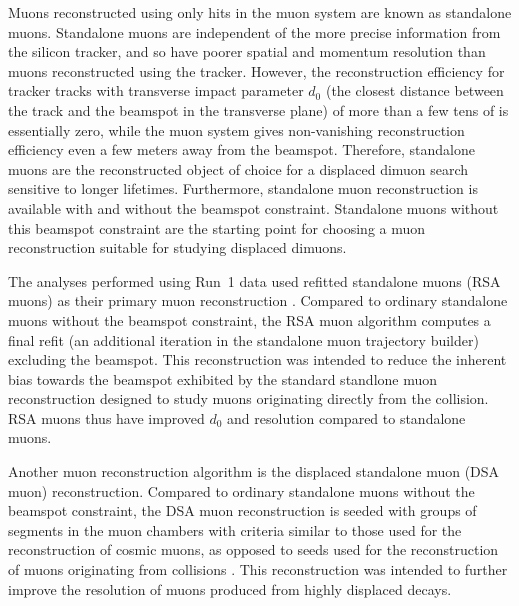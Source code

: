 Muons reconstructed using only hits in the muon system are known as standalone muons.
Standalone muons are independent of the more precise information from the silicon tracker, and so have poorer spatial and momentum resolution than muons reconstructed using the tracker.
However, the reconstruction efficiency for tracker tracks with transverse impact parameter $d_0$ (the closest distance between the track and the beamspot in the transverse plane) of more than a few tens of \cm is essentially zero, while the muon system gives non-vanishing reconstruction efficiency even a few meters away from the beamspot.
Therefore, standalone muons are the reconstructed object of choice for a displaced dimuon search sensitive to longer lifetimes.
Furthermore, standalone muon reconstruction is available with and without the beamspot constraint.
Standalone muons without this beamspot constraint are the starting point for choosing a muon reconstruction suitable for studying displaced dimuons.

The analyses performed using Run~1 data used refitted standalone muons (RSA muons) as their primary muon reconstruction \cite{CMS-PAS-EXO-14-012,CMS-AN-14-176}.
Compared to ordinary standalone muons without the beamspot constraint, the RSA muon algorithm computes a final refit (an additional iteration in the standalone muon trajectory builder) excluding the beamspot.
This reconstruction was intended to reduce the inherent bias towards the beamspot exhibited by the standard standlone muon reconstruction designed to study muons originating directly from the \pp collision.
RSA muons thus have improved $d_0$ and \pT resolution compared to standalone muons.

Another muon reconstruction algorithm is the displaced standalone muon (DSA muon) reconstruction.
Compared to ordinary standalone muons without the beamspot constraint, the DSA muon reconstruction is seeded with groups of segments in the muon chambers with criteria similar to those used for the reconstruction of cosmic muons, as opposed to seeds used for the reconstruction of muons originating from \pp collisions \cite{CMS-DP-2015-015}.
This reconstruction was intended to further improve the \pT resolution of muons produced from highly displaced decays.

